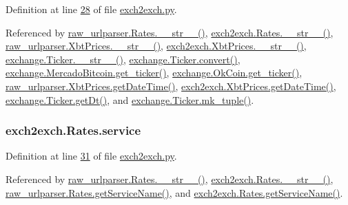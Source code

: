 Definition at line \hyperlink{exch2exch_8py_source_l00028}{28} of file \hyperlink{exch2exch_8py_source}{exch2exch.\+py}.



Referenced by \hyperlink{raw__urlparser_8py_source_l00038}{raw\+\_\+urlparser.\+Rates.\+\_\+\+\_\+str\+\_\+\+\_\+()}, \hyperlink{exch2exch_8py_source_l00042}{exch2exch.\+Rates.\+\_\+\+\_\+str\+\_\+\+\_\+()}, \hyperlink{raw__urlparser_8py_source_l00074}{raw\+\_\+urlparser.\+Xbt\+Prices.\+\_\+\+\_\+str\+\_\+\+\_\+()}, \hyperlink{exch2exch_8py_source_l00091}{exch2exch.\+Xbt\+Prices.\+\_\+\+\_\+str\+\_\+\+\_\+()}, \hyperlink{exchange_8py_source_l00099}{exchange.\+Ticker.\+\_\+\+\_\+str\+\_\+\+\_\+()}, \hyperlink{exchange_8py_source_l00055}{exchange.\+Ticker.\+convert()}, \hyperlink{exchange_8py_source_l00306}{exchange.\+Mercado\+Bitcoin.\+get\+\_\+ticker()}, \hyperlink{exchange_8py_source_l00371}{exchange.\+Ok\+Coin.\+get\+\_\+ticker()}, \hyperlink{raw__urlparser_8py_source_l00059}{raw\+\_\+urlparser.\+Xbt\+Prices.\+get\+Date\+Time()}, \hyperlink{exch2exch_8py_source_l00067}{exch2exch.\+Xbt\+Prices.\+get\+Date\+Time()}, \hyperlink{exchange_8py_source_l00081}{exchange.\+Ticker.\+get\+Dt()}, and \hyperlink{exchange_8py_source_l00084}{exchange.\+Ticker.\+mk\+\_\+tuple()}.

\subsubsection[{\texorpdfstring{service}{service}}]{\setlength{\rightskip}{0pt plus 5cm}exch2exch.\+Rates.\+service}\hypertarget{classexch2exch_1_1_rates_a94c1394b9259d6a7c8f3c12bbd20e685}{}\label{classexch2exch_1_1_rates_a94c1394b9259d6a7c8f3c12bbd20e685}


Definition at line \hyperlink{exch2exch_8py_source_l00031}{31} of file \hyperlink{exch2exch_8py_source}{exch2exch.\+py}.



Referenced by \hyperlink{raw__urlparser_8py_source_l00038}{raw\+\_\+urlparser.\+Rates.\+\_\+\+\_\+str\+\_\+\+\_\+()}, \hyperlink{exch2exch_8py_source_l00042}{exch2exch.\+Rates.\+\_\+\+\_\+str\+\_\+\+\_\+()}, \hyperlink{raw__urlparser_8py_source_l00035}{raw\+\_\+urlparser.\+Rates.\+get\+Service\+Name()}, and \hyperlink{exch2exch_8py_source_l00039}{exch2exch.\+Rates.\+get\+Service\+Name()}.

